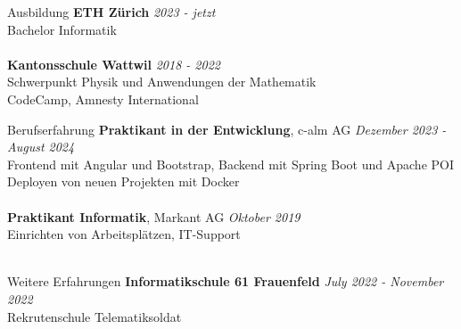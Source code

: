 \documentclass{resume} %
\begin{document}


\begin{rSection}{Ausbildung}
{\bf ETH Zürich} \hfill {\em 2023 - jetzt }
\\ Bachelor Informatik \hfill %
\\\\
{\bf Kantonsschule Wattwil} \hfill {\em 2018 - 2022 }
\\ Schwerpunkt Physik und Anwendungen der Mathematik \hfill %
\\ CodeCamp, Amnesty International
\\

\end{rSection}
\begin{rSection}{Berufserfahrung}
{\bf Praktikant in der Entwicklung}{, c-alm AG} \hfill {\em Dezember 2023 - August 2024 }\\
Frontend mit Angular und Bootstrap, Backend mit Spring Boot und Apache POI\\
Deployen von neuen Projekten mit Docker\\\\
{\bf Praktikant Informatik}{, Markant AG} \hfill {\em Oktober 2019 }\\
Einrichten von Arbeitsplätzen, IT-Support\\\\
\end{rSection}
\begin{rSection}{Weitere Erfahrungen}
{\bf Informatikschule 61 Frauenfeld} \hfill {\em July 2022 - November 2022 }
\\ Rekrutenschule Telematiksoldat \hfill %
\\\\
\end{rSection}
\end{document}
